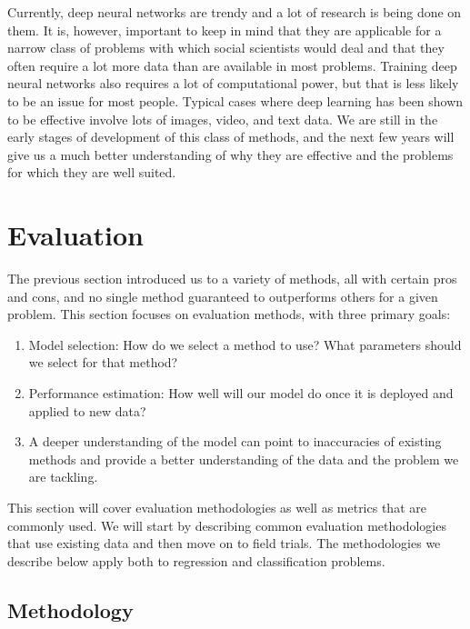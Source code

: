 \documentclass[]{krantz}
\begin{document}
Currently, deep neural networks are trendy and a lot of research is
being done on them. It is, however, important to keep in mind that they
are applicable for a narrow class of problems with which social
scientists would deal and that they often require a lot more data than
are available in most problems. Training deep neural networks also
requires a lot of computational power, but that is less likely to be an
issue for most people. Typical cases where deep learning has been shown
to be effective involve lots of images, video, and text data. We are
still in the early stages of development of this class of methods, and
the next few years will give us a much better understanding of why they
are effective and the problems for which they are well suited.

\section{Evaluation}\label{evaluation}

The previous section introduced us to a variety of methods, all with
certain pros and cons, and no single method guaranteed to outperforms
others for a given problem. This section focuses on evaluation methods,
with three primary goals:

\begin{enumerate}
\def\labelenumi{\arabic{enumi}.}
\item
  Model selection: How do we select a method to use? What parameters
  should we select for that method?
\item
  Performance estimation: How well will our model do once it is deployed
  and applied to new data?
\item
  A deeper understanding of the model can point to inaccuracies of
  existing methods and provide a better understanding of the data and
  the problem we are tackling.
\end{enumerate}

This section will cover evaluation methodologies as well as metrics that
are commonly used. We will start by describing common evaluation
methodologies that use existing data and then move on to field trials.
The methodologies we describe below apply both to regression and
classification problems.

\subsection{Methodology}\label{methodology}
\end{document}

